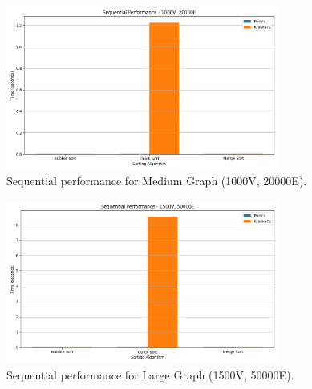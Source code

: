 \documentclass[11pt]{article}
\begin{document}
\begin{figure}[H]
    \centering
    \includegraphics[width=0.8\textwidth]{sequential_medium.png}
    \caption{Sequential performance for Medium Graph (1000V, 20000E).}
    \label{fig:sequential_medium}
\end{figure}

\begin{figure}[H]
    \centering
    \includegraphics[width=0.8\textwidth]{sequential_large.png}
    \caption{Sequential performance for Large Graph (1500V, 50000E).}
    \label{fig:sequential_large}
\end{figure}
\end{document}
